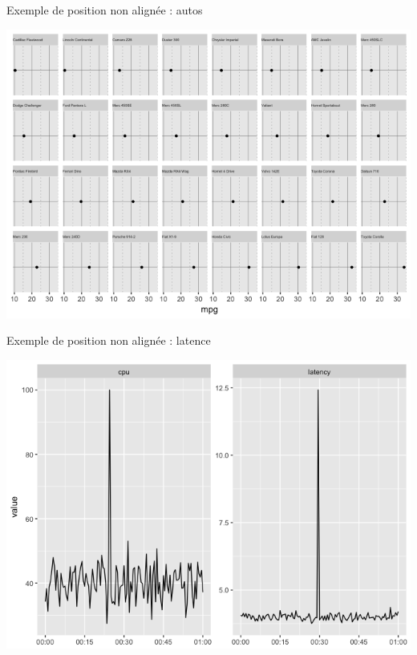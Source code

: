 \documentclass[french]{beamer}
\begin{document}
\begin{frame}{Exemple de position non alignée : autos}
\begin{center}
	\includegraphics[height=0.8\textheight]{autosloc}
\end{center}
\end{frame}

\begin{frame}{Exemple de position non alignée : latence}
\begin{center}
	\includegraphics[height=0.8\textheight]{latency}
\end{center}
\end{frame}
\end{document}
